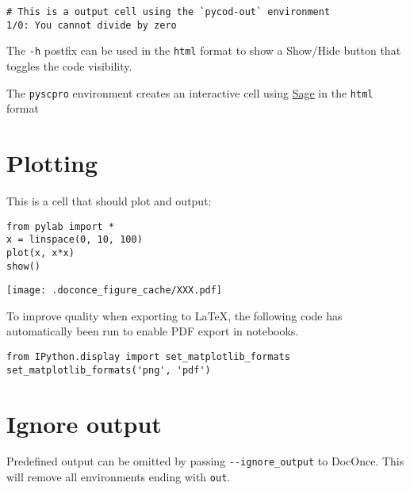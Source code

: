\documentclass[%
oneside,                 %
final,                   %
chapterprefix=true,      %
open=right,              %
10pt]{book}
\begin{document}
\begin{Verbatim}[numbers=none,fontsize=\fontsize{9pt}{9pt},baselinestretch=0.95]
# This is a output cell using the `pycod-out` environment
1/0: You cannot divide by zero
\end{Verbatim}

The \texttt{-h} postfix can be used in the \texttt{html} format to show a Show/Hide button that toggles the code visibility. 

The \texttt{pyscpro} environment creates an interactive cell using \href{{https://github.com/sagemath/sagecell/}}{Sage} in the \texttt{html} format

\section{Plotting}

This is a cell that should plot and output:






\begin{Verbatim}[numbers=none,fontsize=\fontsize{9pt}{9pt},baselinestretch=0.95]
from pylab import *
x = linspace(0, 10, 100)
plot(x, x*x)
show()

\end{Verbatim}

\begin{center}
   \texttt{[image: .doconce\_figure\_cache/XXX.pdf]}
\end{center}


To improve quality when exporting to {\LaTeX}, the following code has automatically
been run to enable PDF export in notebooks.




\begin{Verbatim}[numbers=none,fontsize=\fontsize{9pt}{9pt},baselinestretch=0.95]
from IPython.display import set_matplotlib_formats
set_matplotlib_formats('png', 'pdf')

\end{Verbatim}


\section{Ignore output}

Predefined output can be omitted by passing \Verb!--ignore_output! to DocOnce.
This will remove all environments ending with \texttt{out}.
\end{document}
